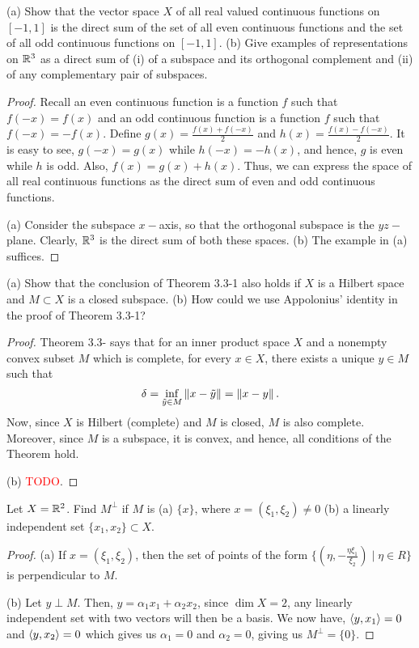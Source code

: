 \begin{question}
   (a) Show that the vector space $X$ of all real valued continuous functions on $[-1,1]$ is the direct sum of the set of all even continuous functions and the set of all odd continuous functions on $[-1,1]$. (b) Give examples of representations on $\mathbb{R}^3$ as a direct sum of (i) of a subspace and its orthogonal complement and (ii) of any complementary pair of subspaces.
    \label{section3.3-3}
\end{question}
\begin{proof}
    Recall an even continuous function is a function $f$ such that $f(-x) = f(x)$ and an odd continuous function is a function $f$ such that $f(-x) = -f(x)$. Define $g(x) = \frac{f(x) + f(-x)}{2}$ and $h(x) = \frac{f(x) - f(-x)}{2}$. It is easy to see, $g(-x) = g(x)$ while $h(-x) = -h(x)$, and hence, $g$ is even while $h$ is odd. Also, $f(x) = g(x) + h(x)$. Thus, we can express the space of all real continuous functions as the direct sum of even and odd continuous functions.

    (a) Consider the subspace $x-$axis, so that the orthogonal subspace is the $yz-$plane. Clearly, $\mathbb{R}^3$ is the direct sum of both these spaces. (b) The example in (a)
    suffices.
 
\end{proof}

\begin{question}
    (a) Show that the conclusion of Theorem 3.3-1 also holds if $X$ is a Hilbert space and $M \subset X$ is a closed subspace. (b) How could we use Appolonius' identity in the proof of Theorem 3.3-1?
    \label{section3.3-4}
\end{question}
\begin{proof}
    Theorem 3.3- says that for an inner product space $X$ and a nonempty convex subset $M$ which is complete, for every $x \in X$, there exists a unique $y \in M$ such that
    \[\delta = \inf_{\tilde{y} \in M} \left\lVert x - \tilde{y} \right\rVert = \left\lVert x - y \right\rVert.\]
    Now, since $X$ is Hilbert (complete) and $M$ is closed, $M$ is also complete. Moreover, since $M$ is a subspace, it is convex, and hence, all conditions of the Theorem hold.

    (b) \textcolor{red}{TODO}.
 \end{proof}

\begin{question}
    Let $X = \mathbb{R}^2$. Find $M^\perp$ if $M$ is (a) $\{x\}$, where $x = (\xi_1 , \xi_2) \neq 0$ (b) a linearly independent set $\{x_1 , x_2\} \subset X$.
    \label{section3.3-5}
\end{question}
\begin{proof}
    (a) If $x = (\xi_1 , \xi_2)$, then the set of points of the form $\{(\eta , -\frac{\eta \xi_1}{\xi_2}) \mid \eta \in R\}$ is perpendicular to $M$.

    (b) Let $y \perp M$. Then, $y = \alpha_1 x_1 + \alpha_2 x_2$, since $\dim X = 2$, any linearly independent set with two vectors will then be a basis. We now have, $\left\langle y , x_1 \right\rangle = 0$ and $\left\langle y , x_2 \right\rangle = 0$ which gives us $\alpha_1 = 0$ and $\alpha_2 = 0$, giving us $M^\perp = \{0\}$.
\end{proof}

